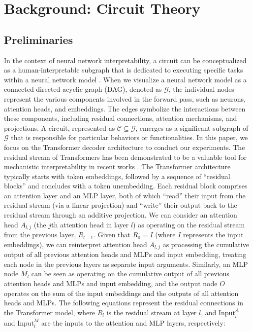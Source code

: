 \section{Background: Circuit Theory}
\subsection{Preliminaries} 
In the context of neural network interpretability, a circuit can be conceptualized as a human-interpretable subgraph that is dedicated to executing specific tasks within a neural network model \cite{olah2020zoom,wang2023interpretability,lv2024interpreting,acdc,bereska2024mechanistic}. 
When we visualize a neural network model as a connected directed acyclic graph (DAG), denoted as $\mathcal{G}$, the individual nodes represent the various components involved in the forward pass, such as neurons, attention heads, and embeddings. 
The edges symbolize the interactions between these components, including residual connections, attention mechanisms, and projections. 
A circuit, represented as $\mathcal{C} \subseteq \mathcal{G}$, emerges as a significant subgraph of $\mathcal{G}$ that is responsible for particular behaviors or functionalities.
In this paper, we focus on the Transformer decoder architecture to conduct our experiments. 
The residual stream of Transformers has been demonstrated to be a valuable tool for mechanistic interpretability in recent works \cite{elhage2021mathematical,yu2024locating}. 
The Transformer architecture typically starts with token embeddings, followed by a sequence of ``residual blocks'' and concludes with a token unembedding. 
Each residual block comprises an attention layer and an MLP layer, both of which ``read'' their input from the residual stream (via a linear projection) and ``write'' their output back to the residual stream through an additive projection.
We can consider an attention head $A_{l,j}$ (the $j$th attention head in layer $l$) as operating on the residual stream from the previous layer, $R_{l-1}$. 
Given that $R_0=I$ (where $I$ represents the input embeddings), we can reinterpret attention head $A_{l,j}$ as processing the cumulative output of all previous attention heads and MLPs and input embedding, treating each node in the previous layers as separate input arguments. 
Similarly, an MLP node $M_l$ can be seen as operating on the cumulative output of all previous attention heads and MLPs and input embedding, and the output node $O$ operates on the sum of the input embeddings and the outputs of all attention heads and MLPs.
The following equations represent the residual connections in the Transformer model, where $R_l$ is the residual stream at layer $l$, and $\text{Input}^A_l$ and $\text{Input}^M_l$ are the inputs to the attention and MLP layers, respectively:
